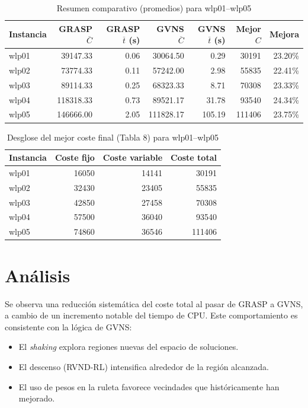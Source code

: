 \documentclass[12pt, a4paper]{report}
\begin{document}
\begin{table}[H]
\centering
\caption{Resumen comparativo (promedios) para wlp01--wlp05}
\label{tab:resumen}
\begin{tabular}{lrrrrrr}
\toprule
Instancia & GRASP $\overline{C}$ & GRASP $\overline{t}$ (s) & GVNS $\overline{C}$ & GVNS $\overline{t}$ (s) & Mejor $C$ & Mejora \\ 
\midrule
wlp01 & 39147.33 & 0.06 & 30064.50 & 0.29 & 30191 & 23.20\% \\ 
wlp02 & 73774.33 & 0.11 & 57242.00 & 2.98 & 55835 & 22.41\% \\ 
wlp03 & 89114.33 & 0.25 & 68323.33 & 8.71 & 70308 & 23.33\% \\ 
wlp04 & 118318.33 & 0.73 & 89521.17 & 31.78 & 93540 & 24.34\% \\ 
wlp05 & 146666.00 & 2.05 & 111828.17 & 105.19 & 111406 & 23.75\% \\ 
\bottomrule
\end{tabular}
\end{table}

\begin{table}[H]
\centering
\caption{Desglose del mejor coste final (Tabla 8) para wlp01--wlp05}
\label{tab:costes}
\begin{tabular}{lrrr}
\toprule
Instancia & Coste fijo & Coste variable & Coste total \\ 
\midrule
wlp01 & 16050 & 14141 & 30191 \\ 
wlp02 & 32430 & 23405 & 55835 \\ 
wlp03 & 42850 & 27458 & 70308 \\ 
wlp04 & 57500 & 36040 & 93540 \\ 
wlp05 & 74860 & 36546 & 111406 \\ 
\bottomrule
\end{tabular}
\end{table}

\section{Análisis}

Se observa una reducción sistemática del coste total al pasar de GRASP a GVNS, a cambio de un incremento notable del tiempo de CPU.
Este comportamiento es consistente con la lógica de GVNS:

\begin{itemize}
  \item El \emph{shaking} explora regiones nuevas del espacio de soluciones.
  \item El descenso (RVND-RL) intensifica alrededor de la región alcanzada.
  \item El uso de pesos en la ruleta favorece vecindades que históricamente han mejorado.
\end{itemize}
\end{document}
